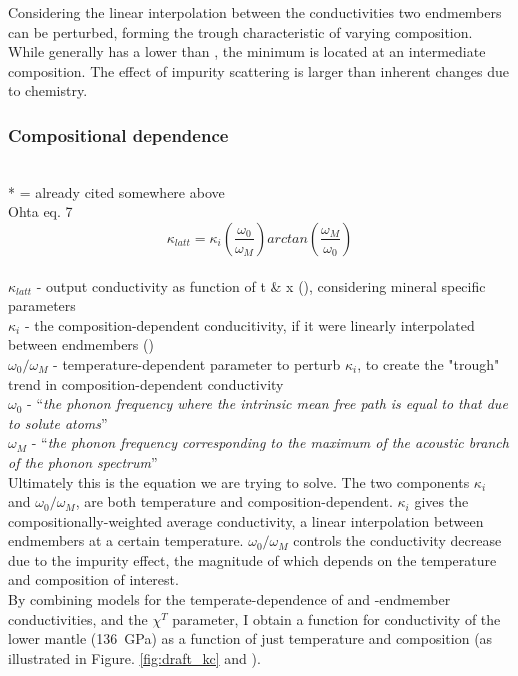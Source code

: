 Considering \citet{Ohta2017} the linear interpolation between the conductivities two endmembers can be perturbed, forming the trough characteristic of varying composition. While \fesios generally has a lower \tcs than \mgsio, the minimum is located at an intermediate composition. The effect of impurity scattering is larger than inherent changes due to chemistry.
    
\subsubsection{Compositional dependence}
\cite{Ohta2017}\\
* = already cited somewhere above\\

Ohta eq. 7 
\begin{equation}%
\kappa_{latt}=\kappa_{i}\left ( \frac{\omega_{0}}{\omega_{M}} \right )arctan\left ( \frac{\omega_{M}}{\omega_{0}} \right )
\label{eq.ohta7}
\end{equation}%
\\ $\kappa_{latt}$ - output conductivity as function of t \& x (\wmk), considering mineral specific parameters\\
$\kappa_{i}$ - the composition-dependent conducitivity, if it were linearly interpolated between endmembers (\wmk)\\
$\omega_{0}/\omega_{M}$ - temperature-dependent parameter to perturb $\kappa_{i}$, to create the "trough" trend in composition-dependent conductivity\\
$\omega_{0}$ - \enquote{\textit{the phonon frequency where the intrinsic mean free path is equal to that due to solute atoms}}\\
$\omega_{M}$ - \enquote{\textit{the phonon frequency corresponding to the maximum of the acoustic branch of the phonon spectrum}}\\

Ultimately this is the equation we are trying to solve. The two components $\kappa_{i}$ and $\omega_{0}/\omega_{M}$, are both temperature and composition-dependent. $\kappa_{i}$ gives the compositionally-weighted average conductivity, a linear interpolation between endmembers at a certain temperature. $\omega_{0}/\omega_{M}$ controls the conductivity decrease due to the impurity effect, the magnitude of which depends on the temperature and composition of interest.\\

By combining models for the temperate-dependence of \mgsios and \fesio-endmember conductivities, and the $\chi^{T}$ parameter, I obtain a function for conductivity of the lower mantle (136~GPa) as a function of just temperature and composition (as illustrated in Figure. \ref{fig:draft_kc} and ).


